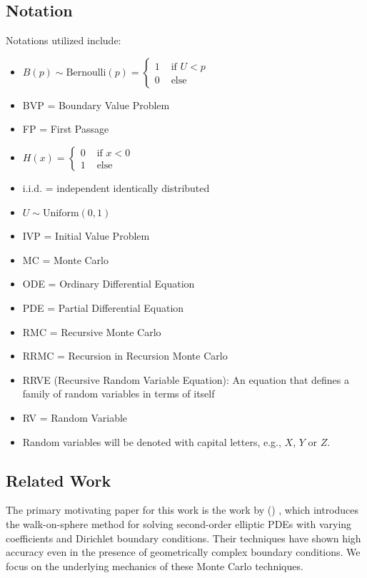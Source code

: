 \documentclass[a4paper,12pt]{article}
\begin{document}
\subsection{Notation}
Notations utilized include:

\begin{itemize}
    \item $B(p) \sim \text{Bernoulli}(p) =
              \begin{cases}
                  1 & \text{ if } U<p \\
                  0 & \text{ else }
              \end{cases} $
    \item BVP = Boundary Value Problem
    \item FP = First Passage
    \item $ H(x) =
              \begin{cases}
                  0 & \text{ if } x<0 \\
                  1 & \text{ else }
              \end{cases}$
    \item i.i.d. = independent identically distributed
    \item $U \sim \text{Uniform}(0,1)$
    \item IVP = Initial Value Problem
    \item MC = Monte Carlo
    \item ODE = Ordinary Differential Equation
    \item PDE = Partial Differential Equation
    \item RMC = Recursive Monte Carlo
    \item RRMC = Recursion in Recursion Monte Carlo
    \item RRVE (Recursive Random Variable Equation): An equation that defines a
          family of random variables in terms of itself
    \item RV = Random Variable
    \item Random variables will be denoted with capital letters, e.g., $X$, $Y$ or $Z$.
\end{itemize}

\subsection{Related Work}
The primary motivating paper for this work is the work
by \citeauthor{sawhney_grid-free_2022}
(\citeyear{sawhney_grid-free_2022}) \cite{sawhney_grid-free_2022},
which introduces the walk-on-sphere method for solving second-order
elliptic PDEs with varying coefficients and Dirichlet boundary conditions.
Their techniques have shown high accuracy even in the presence of geometrically
complex boundary conditions. We focus on the underlying
mechanics of these Monte Carlo techniques.
\end{document}
